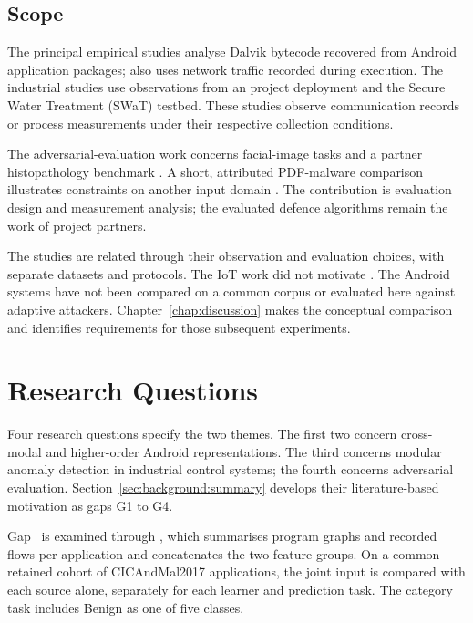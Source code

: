\subsection*{Scope}

The principal empirical studies analyse Dalvik bytecode recovered from Android application
packages; \hybroid{} also uses network traffic recorded during execution. The industrial
studies use observations from an \iuno{} project deployment and the Secure Water Treatment
(SWaT) testbed. These studies observe communication records or process measurements under
their respective collection conditions.

The adversarial-evaluation work concerns facial-image tasks and a partner histopathology
benchmark \cite{sparta2020d72,sparta2022d76}. A short, attributed PDF-malware comparison
illustrates constraints on another input domain \cite{sparta2021d75}. The contribution is
evaluation design and measurement analysis; the evaluated defence algorithms remain the
work of project partners.

The studies are related through their observation and evaluation choices, with separate
datasets and protocols. The IoT work did not motivate \hybroid{}. The Android systems have
not been compared on a common corpus or evaluated here against adaptive attackers.
Chapter~\ref{chap:discussion} makes the conceptual comparison and identifies requirements
for those subsequent experiments.

\section{Research Questions}
\label{sec:intro:rqs}

Four research questions specify the two themes. The first two concern cross-modal and
higher-order Android representations. The third concerns modular anomaly detection in
industrial control systems; the fourth concerns adversarial evaluation.
Section~\ref{sec:background:summary} develops their literature-based motivation as gaps
G1 to G4.


Gap~ is examined through \hybroid{}, which summarises program graphs and recorded
flows per application and concatenates the two feature groups. On a common retained cohort of
CICAndMal2017 applications, the joint input is compared with each source alone, separately for
each learner and prediction task. The category task includes Benign as one of five classes.

